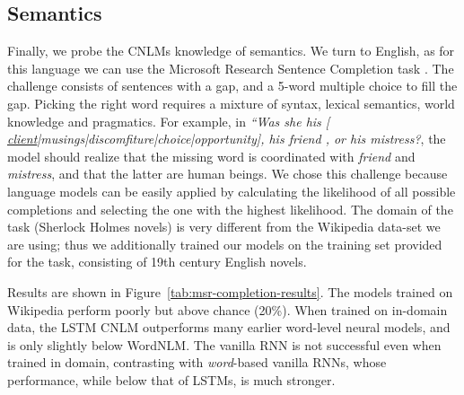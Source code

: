 

\subsection{Semantics}
\label{sec:semantics}

Finally, we probe the CNLMs knowledge of semantics. We turn to
English, as for this language we can use the Microsoft Research
Sentence Completion task \cite{Zweig:Burges:2011}. The challenge
consists of sentences with a gap, and a 5-word multiple choice to fill
the gap. Picking the right word requires a mixture of syntax, lexical
semantics, world knowledge and pragmatics. For example, in \emph{``Was
  she his [
  \underline{client}|musings|discomfiture|choice|opportunity], his
  friend , or his mistress?}, the model should realize that the
missing word is coordinated with \emph{friend} and \emph{mistress},
and that the latter are human beings. We chose this challenge because
language models can be easily applied by calculating the likelihood of
all possible completions and selecting the one with the highest
likelihood. The domain of the task (Sherlock Holmes novels) is very
different from the Wikipedia data-set we are using; thus we
additionally trained our models on the training set provided for the
task, consisting of 19th century English novels.

Results are shown in Figure~\ref{tab:msr-completion-results}.  The
models trained on Wikipedia perform poorly but above chance (20\%).  When trained on in-domain data, the LSTM CNLM outperforms many earlier word-level neural
models, and is only slightly below WordNLM. %
The vanilla RNN is not successful even when trained in domain,
contrasting with \emph{word}-based vanilla RNNs, whose performance,
while below that of LSTMs, is much stronger. %

